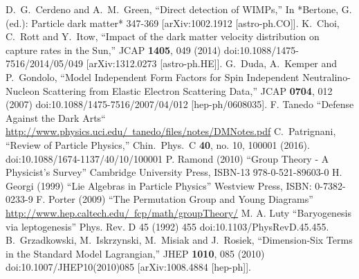 \begin{thebibliography}{xxx}
    D.~G.~Cerdeno and A.~M.~Green,
  ``Direct detection of WIMPs,''
  In *Bertone, G. (ed.): Particle dark matter* 347-369
  [arXiv:1002.1912 [astro-ph.CO]].
    K.~Choi, C.~Rott and Y.~Itow,
  ``Impact of the dark matter velocity distribution on capture rates in the Sun,''
  JCAP {\bf 1405}, 049 (2014)
  doi:10.1088/1475-7516/2014/05/049
  [arXiv:1312.0273 [astro-ph.HE]].
    G.~Duda, A.~Kemper and P.~Gondolo,
  ``Model Independent Form Factors for Spin Independent Neutralino-Nucleon Scattering from Elastic Electron Scattering Data,''
  JCAP {\bf 0704}, 012 (2007)
  doi:10.1088/1475-7516/2007/04/012
  [hep-ph/0608035].
  F. Tanedo ``Defense Against the Dark Arts``\\ \href{http://www.physics.uci.edu/~tanedo/files/notes/DMNotes.pdf}{http://www.physics.uci.edu/~tanedo/files/notes/DMNotes.pdf}
   C.~Patrignani,
  ``Review of Particle Physics,''
  Chin.\ Phys.\ C {\bf 40}, no. 10, 100001 (2016).
  doi:10.1088/1674-1137/40/10/100001 
  P. Ramond (2010) ``Group Theory - A Physicist's Survey'' Cambridge University Press, ISBN-13 978-0-521-89603-0 
 H. Georgi (1999) ``Lie Algebras in Particle Physics'' Westview Press, ISBN: 0-7382-0233-9
 F. Porter (2009) ``The Permutation Group and Young Diagrams'' \href{http://www.hep.caltech.edu/~fcp/math/groupTheory/}{http://www.hep.caltech.edu/~fcp/math/groupTheory/}
 M. A. Luty ``Baryogenesis via leptogenesis'' Phys. Rev. D 45 (1992) 455 doi:10.1103/PhysRevD.45.455.
  B.~Grzadkowski, M.~Iskrzynski, M.~Misiak and J.~Rosiek,
  ``Dimension-Six Terms in the Standard Model Lagrangian,''
  JHEP {\bf 1010}, 085 (2010)
  doi:10.1007/JHEP10(2010)085
  [arXiv:1008.4884 [hep-ph]].
\end{thebibliography}